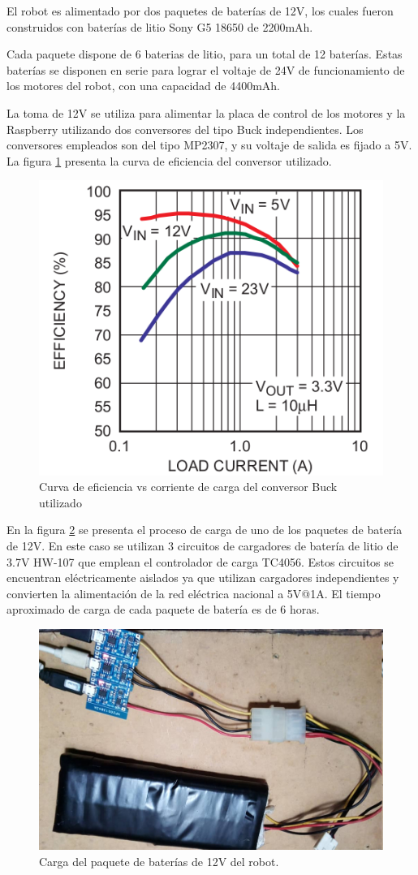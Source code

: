 El robot es alimentado por dos paquetes de baterías de 12V, los cuales fueron construidos con baterías de litio Sony G5 18650 de 2200mAh.

Cada paquete dispone de 6 baterias de litio, para un total de 12 baterías.  Estas baterías se disponen en serie para lograr el voltaje de 24V de funcionamiento de los motores del robot, con una capacidad de 4400mAh. 

La toma de 12V se utiliza para alimentar la placa de control de los motores y la Raspberry utilizando dos conversores del tipo Buck independientes. Los conversores empleados son del tipo MP2307, y su voltaje de salida es fijado a  5V. La figura \ref{imagen:BuckCurva} presenta la curva de eficiencia del conversor utilizado.


\begin{figure}[H]
	\centering	
	\includegraphics[width=0.5\linewidth]{imagenes/prototipo/Buck}
	\caption{Curva de eficiencia vs corriente de carga del conversor Buck utilizado}
	\label{imagen:BuckCurva}
\end{figure}


En la figura \ref{imagen:Bateria} se presenta el proceso de carga de uno de los paquetes de batería de 12V. En este caso se utilizan 3 circuitos de cargadores de batería de litio de 3.7V HW-107 que emplean el controlador de carga TC4056. Estos circuitos se encuentran eléctricamente aislados ya que utilizan cargadores independientes y convierten la alimentación de la red eléctrica nacional a 5V@1A. El tiempo aproximado de carga de cada paquete de batería es de 6 horas.

\begin{figure}[H]
	\centering	
	\includegraphics[width=0.7\linewidth]{imagenes/prototipo/Bateria}
	\caption{Carga del paquete de baterías de 12V del robot.}
	\label{imagen:Bateria}
\end{figure}

